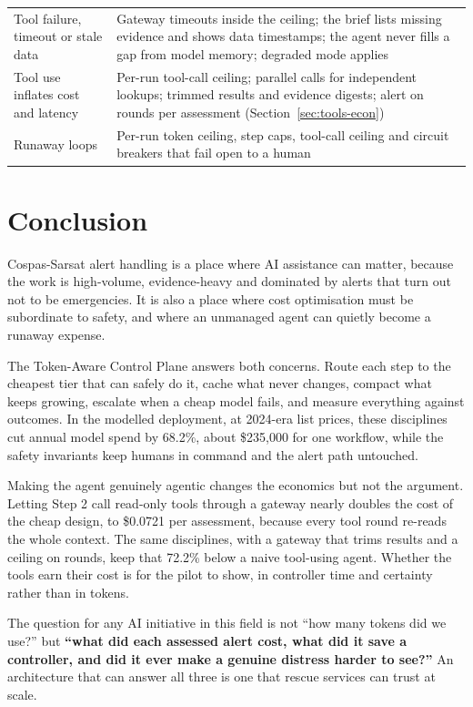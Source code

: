 \documentclass[conference]{IEEEtran}
\begin{document}
\begin{table}[!t]
\begin{tabularx}{\textwidth}{@{}Y Y@{}}
Tool failure, timeout or stale data & Gateway timeouts inside the ceiling; the brief lists missing evidence and shows data timestamps; the agent never fills a gap from model memory; degraded mode applies \\
Tool use inflates cost and latency & Per-run tool-call ceiling; parallel calls for independent lookups; trimmed results and evidence digests; alert on rounds per assessment (Section~\ref{sec:tools-econ}) \\
Runaway loops & Per-run token ceiling, step caps, tool-call ceiling and circuit breakers that fail open to a human \\
\bottomrule
\end{tabularx}
\end{table}

\section{Conclusion}
\label{sec:concl}

Cospas-Sarsat alert handling is a place where AI assistance can matter, because the work is high-volume, evidence-heavy and dominated by alerts that turn out not to be emergencies. It is also a place where cost optimisation must be subordinate to safety, and where an unmanaged agent can quietly become a runaway expense.

The Token-Aware Control Plane answers both concerns. Route each step to the cheapest tier that can safely do it, cache what never changes, compact what keeps growing, escalate when a cheap model fails, and measure everything against outcomes. In the modelled deployment, at 2024-era list prices, these disciplines cut annual model spend by 68.2\%, about \$235,000 for one workflow, while the safety invariants keep humans in command and the alert path untouched.

Making the agent genuinely agentic changes the economics but not the argument. Letting Step 2 call read-only tools through a gateway nearly doubles the cost of the cheap design, to \$0.0721 per assessment, because every tool round re-reads the whole context. The same disciplines, with a gateway that trims results and a ceiling on rounds, keep that 72.2\% below a naive tool-using agent. Whether the tools earn their cost is for the pilot to show, in controller time and certainty rather than in tokens.

The question for any AI initiative in this field is not ``how many tokens did we use?'' but \textbf{``what did each assessed alert cost, what did it save a controller, and did it ever make a genuine distress harder to see?''} An architecture that can answer all three is one that rescue services can trust at scale.
\end{document}
